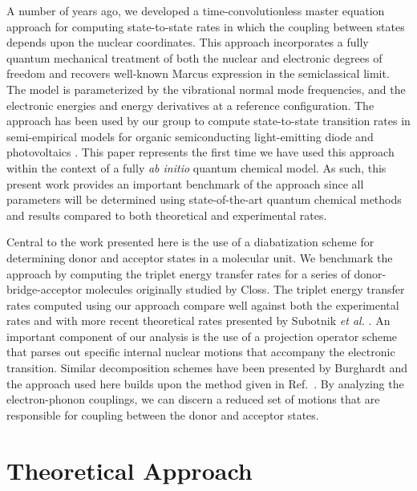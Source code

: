 A number of years ago,  we developed a time-convolutionless  master equation approach for computing
state-to-state rates in which the coupling between  states depends upon the
nuclear coordinates\cite{pereverzev:104906}. This approach incorporates a fully quantum
mechanical treatment of both the nuclear and electronic degrees of freedom and recovers
well-known Marcus expression in the semiclassical limit.  The model is parameterized by the
vibrational normal mode frequencies, and the electronic energies and energy derivatives
at a reference configuration.  The approach has been used by our group to compute state-to-state
transition rates in semi-empirical models for organic semiconducting light-emitting diode and photovoltaics
\cite{Tamura08,tamura:021103,Bittner:2014ab,Jaykrishna-Singh:2009ly}.
This paper represents the first time we have used this approach within the context of a fully {\em ab initio} quantum
chemical model.   As such, this present work provides an important benchmark of the approach since all parameters will be determined
using state-of-the-art quantum chemical methods
and results compared to both theoretical and experimental
rates.

Central to the work presented here is the use of a diabatization scheme for determining
donor and acceptor states in a molecular unit.  We benchmark the approach
by computing the  triplet energy transfer rates for a series of donor-bridge-acceptor molecules
originally studied by Closs\cite{miller1984intramolecular}.  The triplet energy transfer rates computed using our approach
compare well against both the experimental rates and with
more recent theoretical rates presented by Subotnik {\em et al.}
\cite{subotnik2008constructing,subotnik2009initial,Subotnik:2010}.
An important component of our analysis is the use of a projection operator scheme
that parses out specific internal nuclear motions that accompany
the electronic transition.
Similar decomposition schemes have been presented by Burghardt
 \cite{Cederbaum:2005,gindensperger:144103,gindensperger:144104,PhysRevLett.94.113003}
 and the approach used here builds upon the method given in Ref.~\cite{pereverzev:034104}.
 By analyzing the electron-phonon couplings, we can
discern a reduced set of motions that are responsible for coupling between the donor and
acceptor states.



\section{Theoretical Approach}

